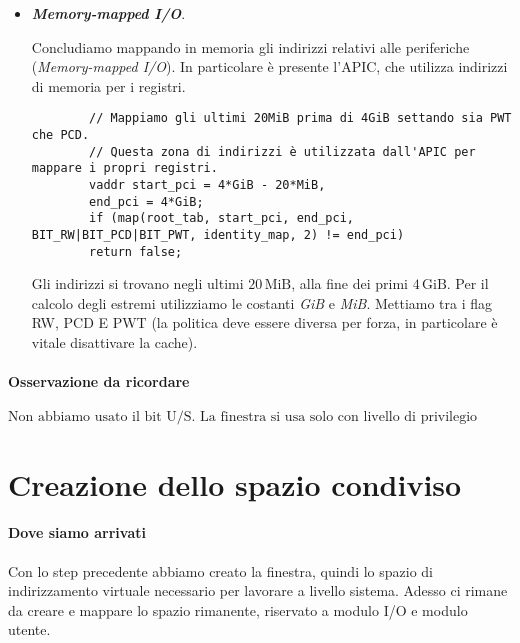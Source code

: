 \begin{itemize}
	\item \textbf{\emph{Memory-mapped I/O}}.
	
	Concludiamo mappando in memoria gli indirizzi relativi alle periferiche (\emph{Memory-mapped I/O}). In particolare è presente l'APIC, che utilizza indirizzi di memoria per i registri. 
	\small
	\begin{verbatim}
		// Mappiamo gli ultimi 20MiB prima di 4GiB settando sia PWT che PCD.
		// Questa zona di indirizzi è utilizzata dall'APIC per mappare i propri registri.
		vaddr start_pci = 4*GiB - 20*MiB,
		end_pci = 4*GiB;
		if (map(root_tab, start_pci, end_pci, BIT_RW|BIT_PCD|BIT_PWT, identity_map, 2) != end_pci)
		return false;
	\end{verbatim}
	\normalsize 
	Gli indirizzi si trovano negli ultimi $20\,\text{MiB}$, alla fine dei primi $4\,\text{GiB}$. Per il calcolo degli estremi utilizziamo le costanti \emph{GiB} e \emph{MiB}. Mettiamo tra i flag RW, PCD E PWT (la politica deve essere diversa per forza, in particolare è vitale disattivare la cache).
\end{itemize}
\paragraph{Osservazione da ricordare}
\[\boxed{\text{Non abbiamo usato il bit U/S. La finestra si usa solo con livello di privilegio sistema.}}\]
\clearpage 


\section{Creazione dello spazio condiviso}
\paragraph{Dove siamo arrivati} Con lo step precedente abbiamo creato la finestra, quindi lo spazio di indirizzamento virtuale necessario per lavorare a livello sistema. Adesso ci rimane da creare e mappare lo spazio rimanente, riservato a modulo I/O e modulo utente.
